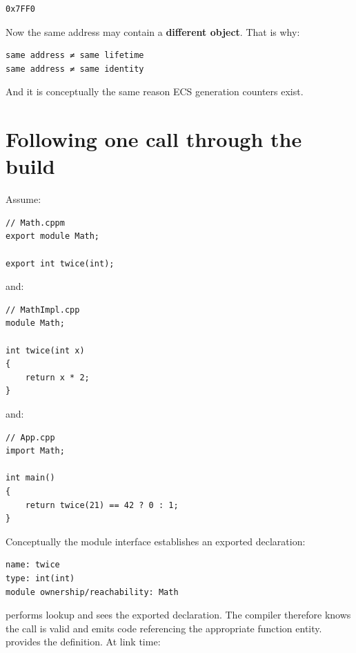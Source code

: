 \begin{verbatim}
0x7FF0
\end{verbatim}

Now the same address may contain a \textbf{different object}. That is why:

\begin{verbatim}
same address ≠ same lifetime
same address ≠ same identity
\end{verbatim}

And it is conceptually the same reason ECS generation counters exist.

\section{Following one call through the build}\label{01-foundations-i-ch003-following-one-call-through-the-build}

\hypertarget{01-foundations-i-ch003-following-one-call-through-the-build}{}

Assume:

\begin{verbatim}
// Math.cppm
export module Math;

export int twice(int);
\end{verbatim}

and:

\begin{verbatim}
// MathImpl.cpp
module Math;

int twice(int x)
{
    return x * 2;
}
\end{verbatim}

and:

\begin{verbatim}
// App.cpp
import Math;

int main()
{
    return twice(21) == 42 ? 0 : 1;
}
\end{verbatim}

Conceptually the module interface establishes an exported declaration:

\begin{verbatim}
name: twice
type: int(int)
module ownership/reachability: Math
\end{verbatim}

 performs lookup and sees the exported declaration. The compiler therefore knows the call is valid and emits code referencing the appropriate function entity.  provides the definition. At link time:


